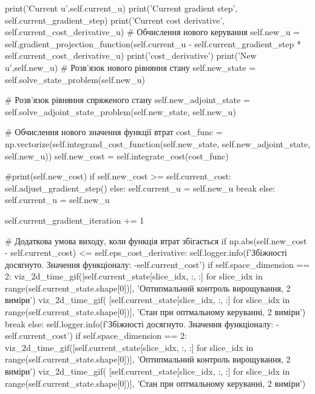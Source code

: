 \documentclass[a4paper,12pt]{extreport}
\begin{document}
\begin{python}[utf8]
                    print('Current u',self.current_u)
                    print('Current gradient step', self.current_gradient_step)
                    print('Current cost derivative', self.current_cost_derivative_u)
                    # Обчислення нового керування
                    self.new_u = self.gradient_projection_function(self.current_u - self.current_gradient_step *
                                                                  self.current_cost_derivative_u)
                    print('cost_derivative')
                    print('New u',self.new_u)
                    # Розв'язок нового рівняння стану
                    self.new_state = self.solve_state_problem(self.new_u)
    
                    # Розв'язок рівняння спряженого стану
                    self.new_adjoint_state = self.solve_adjoint_state_problem(self.new_state, self.new_u)
    
                    # Обчислення нового значення функції втрат
                    cost_func = np.vectorize(self.integrand_cost_function(self.new_state, self.new_adjoint_state, self.new_u))
                    self.new_cost = self.integrate_cost(cost_func)
    
                    #print(self.new_cost)
                    if self.new_cost >= self.current_cost:
                        self.adjust_gradient_step()
                    else:
                        self.current_u = self.new_u
                        break
                else:
                    self.current_u = self.new_u
    
                self.current_gradient_iteration += 1
    
                # Додаткова умова виходу, коли функція втрат збігається
                if np.abs(self.new_cost - self.current_cost) <= self.eps_cost_derivative:
                    self.logger.info(f'Збіжності досягнуто. Значення функціоналу: {-self.current_cost}')
                    if self.space_dimension == 2:
                        viz_2d_time_gif([self.current_state[slice_idx, :, :] for slice_idx in range(self.current_state.shape[0])],
                                        'Оптипмальний контроль вирощування, 2 виміри')
                        viz_2d_time_gif(
                            [self.current_state[slice_idx, :, :] for slice_idx in range(self.current_state.shape[0])],
                            'Стан при оптмальному керуванні, 2 виміри')
                    break
            else:
                self.logger.info(f'Збіжності досягнуто. Значення функціоналу: {-self.current_cost}')
                if self.space_dimension == 2:
                    viz_2d_time_gif([self.current_state[slice_idx, :, :] for slice_idx in range(self.current_state.shape[0])],
                                    'Оптипмальний контроль вирощування, 2 виміри')
                    viz_2d_time_gif(
                        [self.current_state[slice_idx, :, :] for slice_idx in range(self.current_state.shape[0])],
                        'Стан при оптмальному керуванні, 2 виміри')
    

\end{python}
\end{document}
